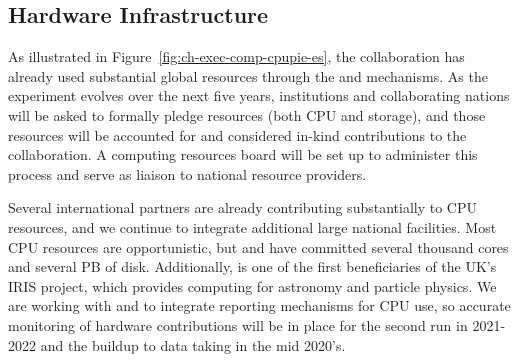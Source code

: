 \subsection{Hardware Infrastructure}
As illustrated in Figure~\ref{fig:ch-exec-comp-cpupie-es}, the  collaboration has already used substantial global resources through the  and  mechanisms. As the experiment evolves over the next five years, institutions and collaborating nations will be asked to formally pledge resources (both CPU and storage), and those resources will be accounted for and considered in-kind contributions to the collaboration.  A   computing resources board  will be set up to administer this process and serve as liaison to national resource providers. 

Several international partners are already contributing substantially to CPU resources, and we continue to  integrate additional large national facilities. Most CPU resources are opportunistic, but  and  have committed several thousand cores and several PB of disk. Additionally,   is one of the first beneficiaries of the UK's IRIS project, which provides computing for astronomy and particle physics.  
We are working with  and  to integrate reporting mechanisms for CPU use, so accurate monitoring of hardware contributions will be in place for the second  run in 2021-2022 and the buildup to data taking in the mid 2020's. 


